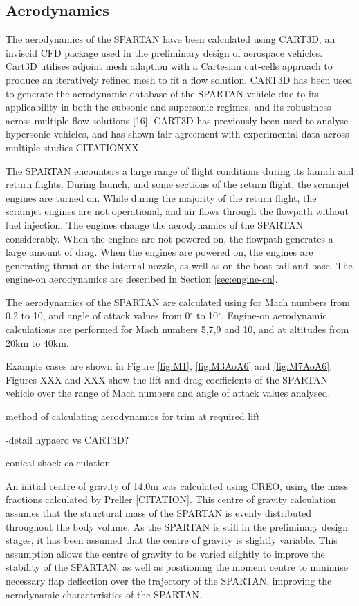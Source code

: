 		
		
		\subsection{Aerodynamics}
		
		The aerodynamics of the SPARTAN have been calculated using CART3D, an inviscid CFD package used in the preliminary design of aerospace vehicles. Cart3D utilises adjoint mesh adaption with a Cartesian cut-cells approach to produce an iteratively refined mesh to fit a flow solution. CART3D has
		been used to generate the aerodynamic database of the SPARTAN vehicle due to its applicability in both the subsonic
		and supersonic regimes, and its robustness across multiple flow solutions [16]. CART3D has previously been used to
		analyse hypersonic vehicles, and has shown fair agreement with experimental data across multiple studies CITATIONXX.
		
		The SPARTAN encounters a large range of flight conditions during its launch and return flights. During launch, and some sections of the return flight, the scramjet engines are turned on. While during the majority of the return flight, the scramjet engines are not operational, and air flows through the flowpath without fuel injection. The engines change the aerodynamics of the SPARTAN considerably. When the engines are not powered on, the flowpath generates a large amount of drag. When the engines are powered on, the engines are generating thrust on the internal nozzle, as well as on the boat-tail and base. The engine-on aerodynamics are described in Section \ref{sec:engine-on}.
		
		The aerodynamics of the SPARTAN are calculated using for Mach numbers from 0.2 to 10, and angle of attack values from 0$^\circ$ to 10$^\circ$. Engine-on aerodynamic calculations are performed for Mach numbers 5,7,9 and 10, and at altitudes from 20km to 40km. 
		
		
		Example cases are shown in Figure \ref{fig:M1}, \ref{fig:M3AoA6} and \ref{fig:M7AoA6}. Figures XXX and XXX show the lift and drag
		coefficients of the SPARTAN vehicle over the range of Mach numbers and angle of attack values analysed.
		
		
		
		
		method of calculating aerodynamics for trim at required lift
		
		-detail hypaero vs CART3D? 
		
		
		conical shock calculation
		
		
		
An initial centre of gravity of 14.0m was calculated using CREO, using the mass fractions calculated by Preller [CITATION]. This centre of gravity calculation assumes that the structural mass of the SPARTAN is evenly distributed throughout the body volume. As the SPARTAN is still in the preliminary design stages, it has been assumed that the centre of gravity is slightly variable. This assumption allows the centre of gravity to be varied slightly to improve the stability of the SPARTAN, as well as positioning the moment centre to minimise necessary flap deflection over the trajectory of the SPARTAN, improving the aerodynamic characteristics of the SPARTAN. 

